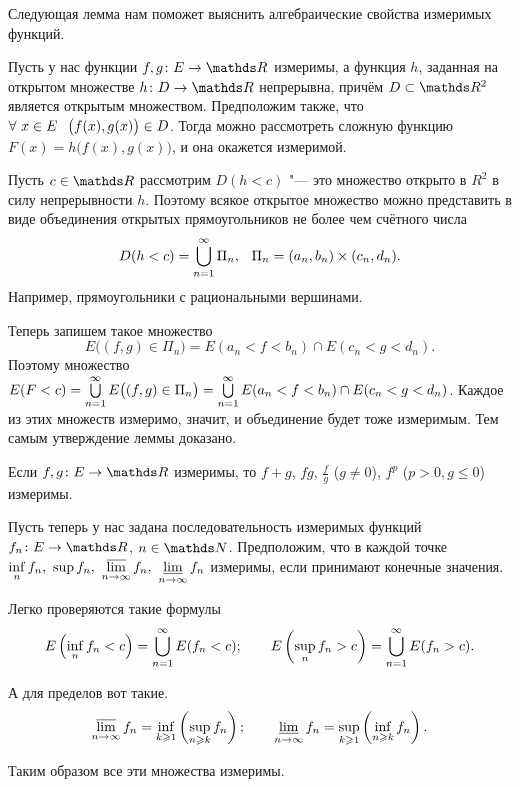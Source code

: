 Следующая лемма нам поможет выяснить алгебраические свойства измеримых функций.
\begin{Lem}
 Пусть у нас функции $f,g\colon E\to \R$ измеримы, а функция $h$, заданная на открытом множестве $h\colon D\to \R$ непрерывна, причём $D\subset \R^2$ является открытым множеством. Предположим также, что $\forall\ x\in E\pau \big(f(x),g(x)\big)\in D$. Тогда можно рассмотреть сложную функцию $F(x) = h\big(f(x),g(x)\big)$, и она окажется измеримой.
\end{Lem}

\begin{Proof}
  Пусть $c\in\R$ рассмотрим $D(h<c)$ "--- это множество открыто в $R^2$ в силу непрерывности $h$. Поэтому всякое открытое множество можно представить в виде объединения открытых прямоугольников не более чем счётного числа
\[ D(h<c) = \uN n1\Pi_n,\pau \Pi_n=(a_n,b_n)\times (c_n,d_n).\]
 Например, прямоугольники с рациональными вершинами.

 Теперь запишем такое множество
\[ E\big((f,g)\in \Pi_n\big) = E(a_n<f<b_n)\cap E(c_n<g<d_n).\]
 Поэтому множество $E(F<c) = \uN n1 E\big((f,g)\in\Pi_n\big) = \uN n1 E(a_n<f<b_n)\cap E(c_n<g<d_n)$. Каждое из этих множеств измеримо, значит, и объединение будет тоже измеримым. Тем самым утверждение леммы доказано.
\end{Proof}

\begin{Sl}\label{avaSl1}
Если $f,g\colon E\to\R$ измеримы, то $f+g$, $fg$, $\frac fg$ ($g\ne 0$), $f^p$ ($p>0,g\le 0$) измеримы.
\end{Sl}

\begin{Sl}\label{avaSl2}
 Пусть теперь у нас задана последовательность измеримых функций $f_n\colon E\to\R$, $n\in\N$. Предположим, что в каждой точке $\inf\limits_n f_n,\ \sup f_n,\ \varlimsup\limits_{n\to\infty} f_n,\ \varliminf\limits_{n\to\infty}f_n$ измеримы, если принимают конечные значения.
\end{Sl}

\begin{Proof}
  Легко проверяются такие формулы
  \[
  E\left(\inf\limits_n f_n<c\right)=\uN n1 E(f_n<c);\qquad
  E\left(\sup\limits_n f_n>c\right)=\uN n1 E(f_n>c).
\]

А для пределов вот такие.
\[\varlimsup\limits_{n\to\infty}f_n = \inf\limits_{k\ge 1}\left(\sup\limits_{n\ge k}f_n\right);\qquad
\varliminf\limits_{n\to\infty}f_n = \sup\limits_{k\ge 1}\left(\inf\limits_{n\ge k}f_n\right).
\]

Таким образом все эти множества измеримы.
\end{Proof}

